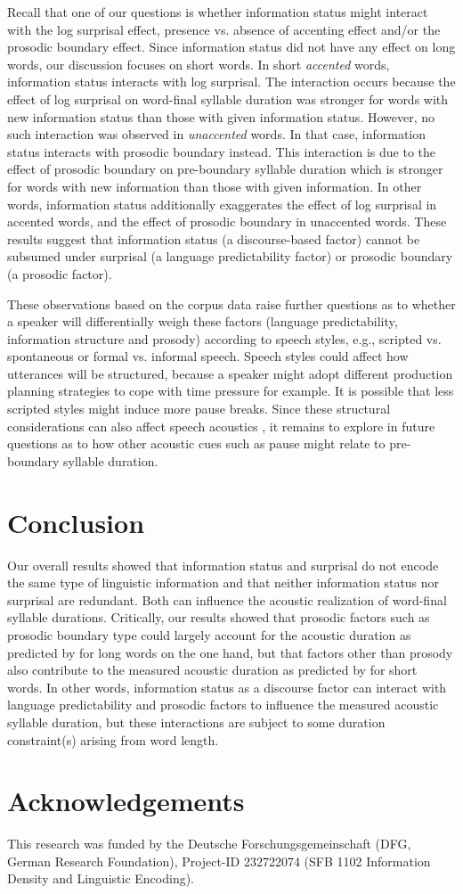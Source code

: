 \documentclass[output=paper,colorlinks,citecolor=brown]{langscibook}
\begin{document}
Recall that one of our questions is whether information status might interact with the log surprisal effect, presence vs. absence of accenting effect and/or the prosodic boundary effect. Since information status did not have any effect on long words, our discussion focuses on short words. In short \textit{accented} words, information status interacts with log surprisal. The interaction occurs because the effect of log surprisal on word-final syllable duration was stronger for words with new information status than those with given information status. However, no such interaction was observed in \textit{unaccented} words. In that case, information status interacts with prosodic boundary instead. This interaction is due to the effect of prosodic boundary on pre-boundary syllable duration which is stronger for words with new information than those with given information. In other words, information status additionally exaggerates the effect of log surprisal in accented words, and the effect of prosodic boundary in unaccented words. These results suggest that information status (a discourse-based factor) cannot be subsumed under surprisal (a language predictability factor) or prosodic boundary (a prosodic factor). 

These observations based on the corpus data raise further questions as to whether a speaker will differentially weigh these factors (language predictability, information structure and prosody) according to speech styles, e.g., scripted vs. spontaneous or formal vs. informal speech. Speech styles could affect how utterances will be structured, because a speaker might adopt different production planning strategies to cope with time pressure for example. It is possible that less scripted styles might induce more pause breaks. Since these structural considerations can also affect speech acoustics \citep[e.g.,][]{Watson2004}, it remains to explore in future questions as to how other acoustic cues such as pause might relate to pre-boundary syllable duration.

 \section{Conclusion}
Our overall results showed that information status and surprisal do not encode the same type of linguistic information and that neither information status nor surprisal are redundant. Both can influence the acoustic realization of word-final syllable durations. Critically, our results showed that prosodic factors such as prosodic boundary type could largely account for the acoustic duration as predicted by \citet{Aylett2004} for long words on the one hand, but that factors other than prosody also contribute to the measured acoustic duration as predicted by \citet{Baker2009} for short words.  In other words, information status as a discourse factor can interact with language predictability and prosodic factors to influence the measured acoustic syllable duration, but these interactions are subject to some duration constraint(s) arising from word length. 

\section*{Acknowledgements}
This research was funded by the Deutsche Forschungsgemeinschaft (DFG, German Research Foundation), Project-ID 232722074 (SFB 1102 Information Density and Linguistic Encoding).

\printbibliography[heading=subbibliography]
\end{document}
